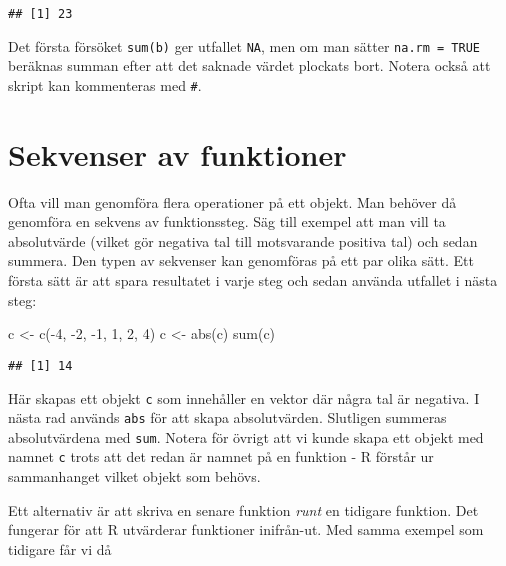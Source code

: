 \documentclass[
]{book}
\newenvironment{Shaded}{\begin{snugshade}}{\end{snugshade}}
\newcommand{\DecValTok}[1]{\textcolor[rgb]{0.00,0.00,0.81}{#1}}
\newcommand{\FunctionTok}[1]{\textcolor[rgb]{0.00,0.00,0.00}{#1}}
\newcommand{\NormalTok}[1]{#1}
\newcommand{\OtherTok}[1]{\textcolor[rgb]{0.56,0.35,0.01}{#1}}
\newcommand{\SpecialCharTok}[1]{\textcolor[rgb]{0.00,0.00,0.00}{#1}}
\theoremstyle{definition}
\theoremstyle{definition}
\theoremstyle{definition}
\theoremstyle{definition}
\theoremstyle{remark}
\begin{document}
\begin{verbatim}
## [1] 23
\end{verbatim}

Det första försöket \texttt{sum(b)} ger utfallet \texttt{NA}, men om man sätter \texttt{na.rm\ =\ TRUE} beräknas summan efter att det saknade värdet plockats bort. Notera också att skript kan kommenteras med \texttt{\#}.

\hypertarget{sekvenser-av-funktioner}{%
\section{Sekvenser av funktioner}\label{sekvenser-av-funktioner}}

Ofta vill man genomföra flera operationer på ett objekt. Man behöver då genomföra en sekvens av funktionssteg. Säg till exempel att man vill ta absolutvärde (vilket gör negativa tal till motsvarande positiva tal) och sedan summera.
Den typen av sekvenser kan genomföras på ett par olika sätt. Ett första sätt är att spara resultatet i varje steg och sedan använda utfallet i nästa steg:

\begin{Shaded}
\begin{Highlighting}[]
\NormalTok{c }\OtherTok{\textless{}{-}} \FunctionTok{c}\NormalTok{(}\SpecialCharTok{{-}}\DecValTok{4}\NormalTok{, }\SpecialCharTok{{-}}\DecValTok{2}\NormalTok{, }\SpecialCharTok{{-}}\DecValTok{1}\NormalTok{, }\DecValTok{1}\NormalTok{, }\DecValTok{2}\NormalTok{, }\DecValTok{4}\NormalTok{)}
\NormalTok{c }\OtherTok{\textless{}{-}} \FunctionTok{abs}\NormalTok{(c)}
\FunctionTok{sum}\NormalTok{(c)}
\end{Highlighting}
\end{Shaded}

\begin{verbatim}
## [1] 14
\end{verbatim}

Här skapas ett objekt \texttt{c} som innehåller en vektor där några tal är negativa. I nästa rad används \texttt{abs} för att skapa absolutvärden. Slutligen summeras absolutvärdena med \texttt{sum}.
Notera för övrigt att vi kunde skapa ett objekt med namnet \texttt{c} trots att det redan är namnet på en funktion - R förstår ur sammanhanget vilket objekt som behövs.

Ett alternativ är att skriva en senare funktion \emph{runt} en tidigare funktion. Det fungerar för att R utvärderar funktioner inifrån-ut. Med samma exempel som tidigare får vi då
\end{document}
